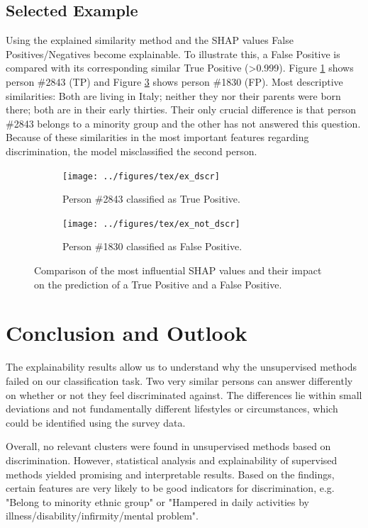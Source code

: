 \documentclass[10pt]{article}
\begin{document}
	\subsection{Selected Example} %
	Using the explained similarity method and the SHAP values False Positives/Negatives become explainable. To illustrate this, a False Positive is compared with its corresponding similar True Positive (>0.999). Figure \ref{fig:ex_dscr} shows person \#2843 (TP) and Figure \ref{fig:ex_not_dscr} shows person \#1830 (FP). Most descriptive similarities: Both are living in Italy; neither they nor their parents were born there; both are in their early thirties. Their only crucial difference is that person \#2843 belongs to a minority group and the other has not answered this question. Because of these similarities in the most important features regarding discrimination, the model misclassified the second person.
	\begin{figure}
		\centering
		\begin{subfigure}[t]{\textwidth}
			\centering
			\texttt{[image: ../figures/tex/ex\_dscr]}
			\caption{Person \#2843 classified as True Positive.}
			\label{fig:ex_dscr}
		\end{subfigure}
		\begin{subfigure}[t]{\textwidth}
			\centering
			\texttt{[image: ../figures/tex/ex\_not\_dscr]}
			\caption{Person \#1830 classified as False Positive.}
			\label{fig:ex_not_dscr}
		\end{subfigure}
		\caption{Comparison of the most influential SHAP values and their impact on the prediction of a True Positive and a False Positive.}
	\end{figure}
	
	\section{Conclusion and Outlook} %
	
	The explainability results allow us to understand why the unsupervised methods failed on our classification task. Two very similar persons can answer differently on whether or not they feel discriminated against. The differences lie within small deviations
	and not fundamentally different lifestyles or circumstances, which could be identified using the survey data. 
	
	Overall, no relevant clusters were found in unsupervised methods based on discrimination. However, statistical analysis and explainability of supervised methods yielded promising and interpretable results. Based on the findings, certain features are very likely to be good indicators for discrimination, e.g. "Belong to minority ethnic group" or "Hampered in daily activities by illness/disability/infirmity/mental problem". 
	
\end{document}
